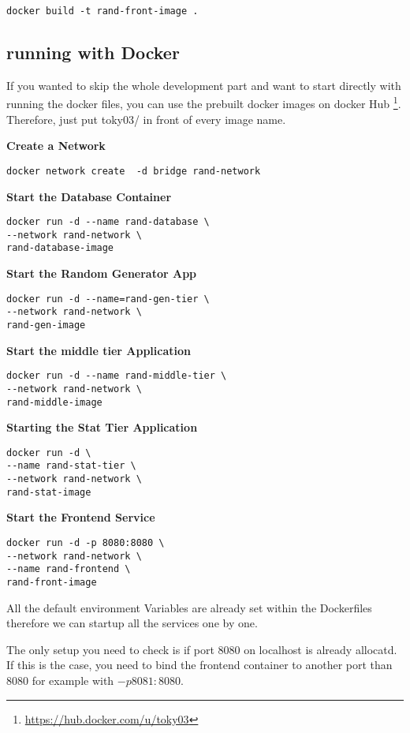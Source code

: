 

\begin{verbatim}
docker build -t rand-front-image .
\end{verbatim}
\newpage

\subsection{running with Docker}

If you wanted to skip the whole development part and want to start directly with running the docker files, you can use the prebuilt docker images on docker Hub \footnote{\url{https://hub.docker.com/u/toky03}}. Therefore, just put toky03/ in front of every image name.

\textbf{Create a Network}
\begin{verbatim}
docker network create  -d bridge rand-network
\end{verbatim}

\textbf{Start the Database Container}

\begin{verbatim}
docker run -d --name rand-database \
--network rand-network \
rand-database-image
\end{verbatim}

\textbf{Start the Random Generator App}
\begin{verbatim}
docker run -d --name=rand-gen-tier \
--network rand-network \
rand-gen-image
\end{verbatim}

\textbf{Start the middle tier Application}
\begin{verbatim}
docker run -d --name rand-middle-tier \
--network rand-network \
rand-middle-image
\end{verbatim}

\textbf{Starting the Stat Tier Application}
\begin{verbatim}
docker run -d \
--name rand-stat-tier \
--network rand-network \ 
rand-stat-image
\end{verbatim}

\textbf{Start the Frontend Service}
\begin{verbatim}
docker run -d -p 8080:8080 \
--network rand-network \
--name rand-frontend \
rand-front-image
\end{verbatim}

All the default environment Variables are already set within the Dockerfiles therefore we can startup all the services one by one.

The only setup you need to check is if port 8080 on localhost is already allocatd. If this is the case, you need to bind the frontend container to another port than 8080 for example with $-p 8081:8080$.
